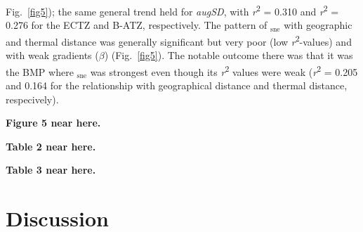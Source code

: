 \documentclass[utf8]{frontiersSCNS} %
\begin{document}
Fig.~\ref{fig5}); the same general trend held for \emph{augSD}, with \emph{r}\textsuperscript{2} = 0.310 and \emph{r}\textsuperscript{2} = 0.276 for the ECTZ and B-ATZ, respectively. The pattern of \textbeta$_{\text{sne}}$ with geographic and thermal distance was generally significant but very poor (low \emph{r}\textsuperscript{2}-values) and with weak gradients ($\beta$) (Fig.~\ref{fig5}). The notable outcome there was that it was the BMP where \textbeta$_{\text{sne}}$ was strongest even though its \emph{r}\textsuperscript{2} values were weak (\emph{r}\textsuperscript{2} = 0.205 and 0.164 for the relationship with geographical distance and thermal distance, respecively).

\textbf{Figure 5 near here.}

\textbf{Table 2 near here.}

\textbf{Table 3 near here.}

\section{Discussion}
\end{document}
